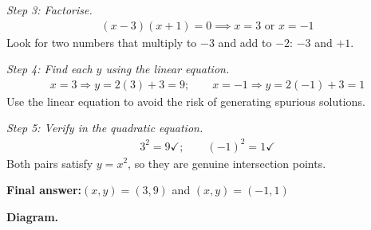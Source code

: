 \documentclass[11pt]{article}
\begin{document}
\textit{Step 3: Factorise.}
\[\begin{gathered}
(x - 3)(x + 1) = 0 \implies x = 3 \text{ or } x = -1
\end{gathered}\]
Look for two numbers that multiply to \( -3 \) and add to \( -2 \): \( -3 \) and \( +1 \).

\textit{Step 4: Find each \( y \) using the linear equation.}
\[\begin{gathered}
x = 3 \Rightarrow y = 2(3) + 3 = 9; \qquad x = -1 \Rightarrow y = 2(-1) + 3 = 1
\end{gathered}\]
Use the linear equation to avoid the risk of generating spurious solutions.

\textit{Step 5: Verify in the quadratic equation.}
\[\begin{gathered}
3^2 = 9 \checkmark; \qquad (-1)^2 = 1 \checkmark
\end{gathered}\]
Both pairs satisfy \( y = x^2 \), so they are genuine intersection points.

\begin{answerbox}
\textbf{Final answer:}\quad \(\displaystyle (x, y) = (3, 9)\) and \(\displaystyle (x, y) = (-1, 1)\)
\end{answerbox}
\textbf{Diagram.}
\end{document}
